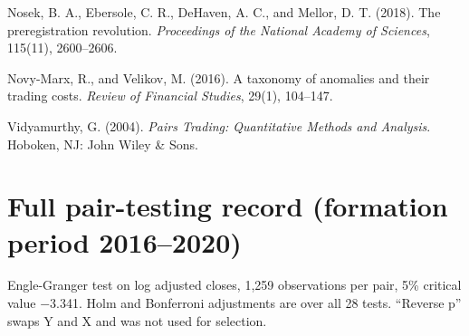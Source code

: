 \documentclass[11pt]{article}
\begin{document}
\begin{list}{}{\setlength{\leftmargin}{1.5em}\setlength{\itemindent}{-1.5em}\setlength{\itemsep}{2pt}\setlength{\parsep}{0pt}}
\item Nosek, B. A., Ebersole, C. R., DeHaven, A. C., and Mellor, D. T. (2018).
The preregistration revolution. \emph{Proceedings of the National Academy of
Sciences}, 115(11), 2600--2606.

\item Novy-Marx, R., and Velikov, M. (2016). A taxonomy of anomalies and their
trading costs. \emph{Review of Financial Studies}, 29(1), 104--147.

\item Vidyamurthy, G. (2004). \emph{Pairs Trading: Quantitative Methods and
Analysis}. Hoboken, NJ: John Wiley \& Sons.

\end{list}

\appendix

\hypertarget{full-pair-testing-record-formation-period-20162020}{%
\section{Full pair-testing record (formation period 2016--2020)}\label{full-pair-testing-record-formation-period-20162020}}

Engle-Granger test on log adjusted closes, 1,259 observations per pair, 5\%
critical value −3.341. Holm and Bonferroni adjustments are over all 28
tests. ``Reverse p'' swaps Y and X and was not used for selection.
\end{document}
